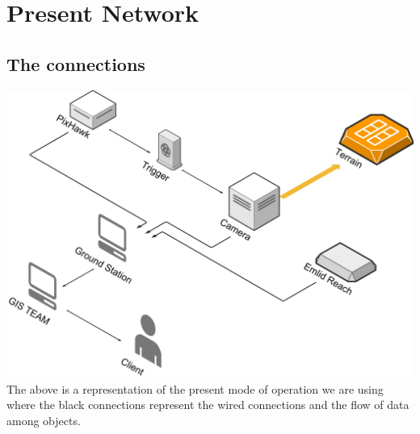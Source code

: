 \documentclass[12pt]{report}
\begin{document}
\chapter{Present Network}
\section{The connections}
\includegraphics[width=\linewidth]{Present_System.jpg}
\\
The above is a representation of the present mode of operation we are using where the black connections represent the wired connections and the flow of data among objects.
\end{document}
